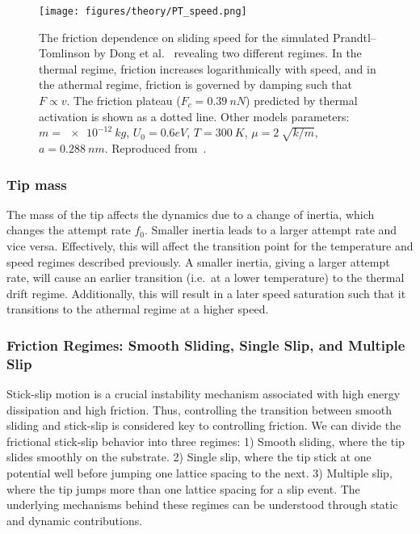 \begin{figure}[!htb]
  \centering
  \texttt{[image: figures/theory/PT\_speed.png]}
  \caption{The friction dependence on sliding speed for the simulated Prandtl–Tomlinson by Dong et al.~\cite{Yalin_2011} revealing two different regimes. In the thermal regime, friction increases logarithmically with speed, and in the athermal regime, friction is governed by damping such that $F\propto v$. The friction plateau ($F_c = \SI{0.39}{nN}$) predicted by thermal activation is shown as a dotted line. Other models parameters: $m=\SI{e-12}{kg}$, $U_0={0.6}{eV}$, $T = \SI{300}{K}$, $\mu=\SI{2}{\sqrt{k/m}}$, $a=\SI{0.288}{nm}$. Reproduced from~\cite{Yalin_2011}.}
  \label{fig:PT_speed}
\end{figure}


\subsubsection{Tip mass}
The mass of the tip affects the dynamics due to a change of inertia, which changes the attempt rate $f_0$. Smaller inertia leads to a larger attempt rate and vice versa. Effectively, this will affect the transition point for the temperature and speed regimes described previously. A smaller inertia, giving a larger attempt rate, will cause an earlier transition (i.e.\ at a lower temperature) to the thermal drift regime. Additionally, this will result in a later speed saturation such that it transitions to the athermal regime at a higher speed. 


\subsubsection{Friction Regimes: Smooth Sliding, Single Slip, and Multiple Slip}
Stick-slip motion is a crucial instability mechanism associated with high energy dissipation and high friction. Thus, controlling the transition between smooth sliding and stick-slip is considered key to controlling friction. We can divide the frictional stick-slip behavior into three regimes: 1) Smooth sliding, where the tip slides smoothly on the substrate. 2) Single slip, where the tip stick at one potential well before jumping one lattice spacing to the next. 3) Multiple slip, where the tip jumps more than one lattice spacing for a slip event. The underlying mechanisms behind these regimes can be understood through static and dynamic contributions. 

